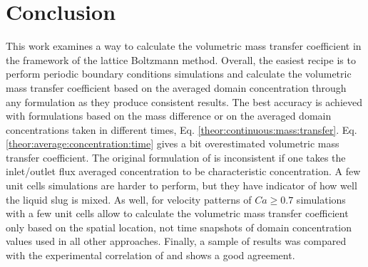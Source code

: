 \documentclass{article}
\begin{document}
\section{Conclusion}
This work examines a way to calculate the volumetric mass transfer coefficient in the framework of
the lattice Boltzmann method. Overall, the easiest recipe is to perform periodic boundary
conditions simulations and calculate the volumetric mass transfer coefficient based on the averaged
domain concentration through any formulation as they produce consistent results. The best accuracy
is achieved with formulations based on the mass difference or on the averaged domain concentrations
taken in different times, Eq. \ref{theor:continuous:mass:transfer}. Eq.
\ref{theor:average:concentration:time} gives a bit overestimated volumetric mass transfer
coefficient. The original formulation of
\citet{vanbaten-circular} is inconsistent if one takes the inlet/outlet flux averaged concentration
to be characteristic concentration. A few unit cells simulations are harder to perform, but they
have indicator of how well the liquid slug is mixed. As well, for velocity patterns of $Ca\geq
0.7$ simulations with a few unit cells allow to calculate the volumetric mass transfer
coefficient only based on the spatial location, not time snapshots of domain concentration values used in all other
approaches. Finally, a sample of results was
compared with the experimental correlation of \citet{yue-mass} and shows a good agreement. 
\appendix
\end{document}
